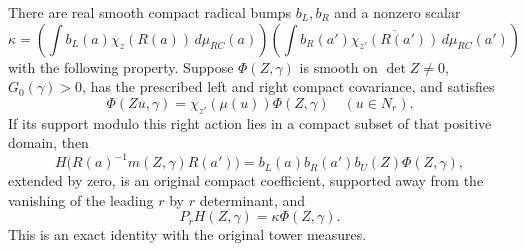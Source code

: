 \begin{theorem}\label{terminal-transfer-compact-lift}
There are real smooth compact radical bumps $b_L,b_R$ and a
nonzero scalar
\begin{equation}\label{terminal-transfer-kappa}
 \kappa=\left(\int b_L(a)\chi_z(R(a))\,d\mu_{RC}(a)\right)
        \left(\int b_R(a')\overline{\chi_{z'}(R(a'))}
                                              \,d\mu_{RC}(a')\right)
\end{equation}
with the following property.  Suppose $\Phi(Z,\gamma)$ is
smooth on $\det Z\ne0$, $G_0(\gamma)>0$, has the prescribed
left and right compact covariance, and satisfies
\[
       \Phi(Zu,\gamma)=\chi_{z'}(\mu(u))\Phi(Z,\gamma)
                                      \quad(u\in N_r).
\]
If its support modulo this right action lies in a compact
subset of that positive domain, then
\begin{equation}\label{terminal-transfer-chart-lift}
 H\bigl(R(a)^{-1}m(Z,\gamma)R(a')\bigr)
       =b_L(a)b_R(a')b_U(Z)\Phi(Z,\gamma),
\end{equation}
extended by zero, is an original compact coefficient, supported
away from the vanishing of the leading $r$ by $r$ determinant,
and
\begin{equation}\label{terminal-transfer-lift-image}
                   P_rH(Z,\gamma)=\kappa\Phi(Z,\gamma).
\end{equation}
This is an exact identity with the original tower measures.
\end{theorem}


